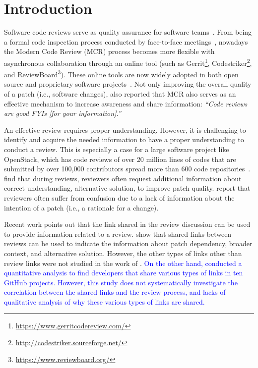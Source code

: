 \section{Introduction}
\label{intro}


Software code reviews serve as quality assurance for software teams~\citep{Huizinga2007AutomatedDP,Rigby_2011}.
From being a formal code inspection process conducted by face-to-face meetings~\citep{Fagan_1976}, nowadays the Modern Code Review (MCR) process becomes more flexible with asynchronous collaboration through an online tool (such as Gerrit\footnote{\url{https://www.gerritcodereview.com/}}, Codestriker\footnote{\url{http://codestriker.sourceforge.net/}}, and ReviewBoard\footnote{\url{https://www.reviewboard.org/}}).
These online tools are now widely adopted in both open source and proprietary software projects~\citep{FSE2013_Rigby, Google_2018}.
Not only improving the overall quality of a patch (i.e., software changes), \cite{Bacchelli_ICSE2013} also reported that MCR also serves as an effective mechanism to increase awareness and share information: \textit{“Code reviews are good FYIs [for your information].”}


An effective review requires proper understanding.
However, it is challenging to identify and acquire
the needed information to have a proper understanding to conduct a review.
This is especially a case for a large software project like OpenStack, which has code reviews of over 20 million lines of codes that are submitted by over 100,000 contributors spread more than 600 code repositories~\citep{minghui_icse2020}.
\citet{Information_2018} find that during reviews, reviewers often request additional information about
correct understanding, alternative solution, to improve patch quality.
\citet{confusion_saner_2019} report that reviewers often suffer from confusion due to a lack of information about the intention of a patch (i.e., a rationale for a change).

Recent work points out that the link shared in the review discussion can be used to provide information related to a review. 
\citet{hirao2019fse} show that shared links between reviews can be used to indicate the information about patch dependency, broader context, and alternative solution.
However, the other types of links other than review links were not studied in the work of \citet{hirao2019fse}.
\textcolor{blue}{On the other hand, \citet{link_sharing_2018} conducted a  quantitative analysis to find developers that share various types of links in ten GitHub projects.
However, this study does not systematically investigate the correlation between the shared links and the review process, and lacks of qualitative analysis of why these various types of links are shared.}

